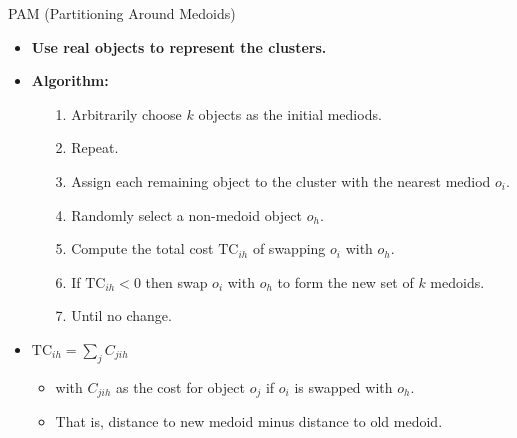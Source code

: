 \documentclass[aspectratio=169,t,xcolor=dvipsnames]{beamer}
\begin{document}
  {
    \begin{frame}{PAM (Partitioning Around Medoids)}
      \begin{itemize}
        \item \textbf{Use real objects to represent the clusters.}
        \item \textbf{Algorithm:}
        \begin{itemize}
          \item[1.] Arbitrarily choose $k$ objects as the initial mediods.
          \item[2.] Repeat.
          \item[3.] \hspace{0.2cm} Assign each remaining object to the cluster with the nearest mediod $o_i$.
          \item[4.] \hspace{0.2cm} Randomly select a non-medoid object $o_h$.
          \item[5.] \hspace{0.2cm} Compute the total cost $\text{TC}_{ih}$ of swapping $o_i$ with $o_h$.
          \item[6.] \hspace{0.2cm} If $\text{TC}_{ih} < 0$ then swap $o_i$ with $o_h$ to form the new set of $k$ medoids.
          \item[7.] Until no change.
        \end{itemize}
        \item $\text{TC}_{ih} = \sum\limits_{j}C_{jih}$
        \begin{itemize}
          \item with $C_{jih}$ as the cost for object $o_j$ if $o_i$ is swapped with $o_h$.
          \item That is, distance to new medoid minus distance to old medoid.
        \end{itemize}
      \end{itemize}
    \end{frame}
  }
\end{document}
